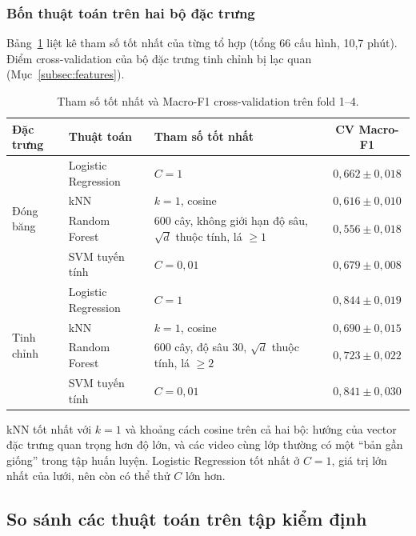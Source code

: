 \subsubsection{Bốn thuật toán trên hai bộ đặc trưng}
\label{subsec:res_classical_cv}

Bảng~\ref{tab:res_cv} liệt kê tham số tốt nhất của từng tổ hợp (tổng 66 cấu hình, 10,7 phút). Điểm cross-validation của bộ đặc trưng tinh chỉnh bị lạc quan (Mục~\ref{subsec:features}).

\begin{table}[H]
  \centering
  \caption{Tham số tốt nhất và Macro-F1 cross-validation trên fold 1--4.}
  \label{tab:res_cv}
  \small
  \begin{tabular}{@{}llp{}c@{}}
    \toprule
    \textbf{Đặc trưng} & \textbf{Thuật toán} & \textbf{Tham số tốt nhất} & \textbf{CV Macro-F1} \\
    \midrule
    \multirow{4}{*}{Đóng băng} & Logistic Regression & $C=1$ & $0{,}662\pm0{,}018$ \\
     & kNN & $k=1$, cosine & $0{,}616\pm0{,}010$ \\
     & Random Forest & 600 cây, không giới hạn độ sâu, $\sqrt{d}$ thuộc tính, lá $\ge1$ & $0{,}556\pm0{,}018$ \\
     & SVM tuyến tính & $C=0{,}01$ & $0{,}679\pm0{,}008$ \\
    \midrule
    \multirow{4}{*}{Tinh chỉnh} & Logistic Regression & $C=1$ & $0{,}844\pm0{,}019$ \\
     & kNN & $k=1$, cosine & $0{,}690\pm0{,}015$ \\
     & Random Forest & 600 cây, độ sâu 30, $\sqrt{d}$ thuộc tính, lá $\ge2$ & $0{,}723\pm0{,}022$ \\
     & SVM tuyến tính & $C=0{,}01$ & $0{,}841\pm0{,}030$ \\
    \bottomrule
  \end{tabular}
\end{table}

kNN tốt nhất với $k=1$ và khoảng cách cosine trên cả hai bộ: hướng của vector đặc trưng quan trọng hơn độ lớn, và các video cùng lớp thường có một ``bản gần giống'' trong tập huấn luyện. Logistic Regression tốt nhất ở $C=1$, giá trị lớn nhất của lưới, nên còn có thể thử $C$ lớn hơn.

\subsection{So sánh các thuật toán trên tập kiểm định}
\label{subsec:res_fold0}

